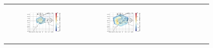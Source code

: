 \begin{figure}[htbp]
    \centering
    \begin{tabular}{ccc}

        \begin{subfigure}[b]{0.33\textwidth}
            \caption{}
            \includegraphics[width=\textwidth]{images/chap4/domain_size/diff_map_cldt_era_LAM_1000km_NBP40.png}
        \end{subfigure} &
        \begin{subfigure}[b]{0.33\textwidth}
            \caption{}
            \includegraphics[width=\textwidth]{images/chap4/domain_size/diff_map_cldt_era_LAM_1500km_NBP60.png}
        \end{subfigure} &
        \begin{subfigure}[b]{0.33\textwidth}
            \caption{}

\end{subfigure}
\end{tabular}
\end{figure}
